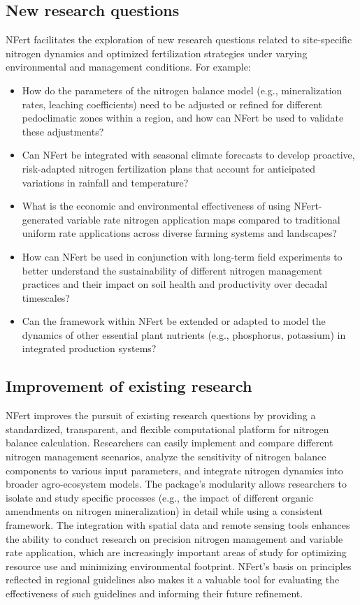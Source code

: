 \documentclass[
  11pt,
]{article}
\begin{document}
\subsection{New research questions}\label{new-research-questions}

NFert facilitates the exploration of new research questions related to
site-specific nitrogen dynamics and optimized fertilization strategies
under varying environmental and management conditions. For example:

\begin{itemize}
\item
  How do the parameters of the nitrogen balance model (e.g.,
  mineralization rates, leaching coefficients) need to be adjusted or
  refined for different pedoclimatic zones within a region, and how can
  NFert be used to validate these adjustments?
\item
  Can NFert be integrated with seasonal climate forecasts to develop
  proactive, risk-adapted nitrogen fertilization plans that account for
  anticipated variations in rainfall and temperature?
\item
  What is the economic and environmental effectiveness of using
  NFert-generated variable rate nitrogen application maps compared to
  traditional uniform rate applications across diverse farming systems
  and landscapes?
\item
  How can NFert be used in conjunction with long-term field experiments
  to better understand the sustainability of different nitrogen
  management practices and their impact on soil health and productivity
  over decadal timescales?
\item
  Can the framework within NFert be extended or adapted to model the
  dynamics of other essential plant nutrients (e.g., phosphorus,
  potassium) in integrated production systems?
\end{itemize}

\subsection{Improvement of existing
research}\label{improvement-of-existing-research}

NFert improves the pursuit of existing research questions by providing a
standardized, transparent, and flexible computational platform for
nitrogen balance calculation. Researchers can easily implement and
compare different nitrogen management scenarios, analyze the sensitivity
of nitrogen balance components to various input parameters, and
integrate nitrogen dynamics into broader agro-ecosystem models. The
package's modularity allows researchers to isolate and study specific
processes (e.g., the impact of different organic amendments on nitrogen
mineralization) in detail while using a consistent framework. The
integration with spatial data and remote sensing tools enhances the
ability to conduct research on precision nitrogen management and
variable rate application, which are increasingly important areas of
study for optimizing resource use and minimizing environmental
footprint. NFert's basis on principles reflected in regional guidelines
also makes it a valuable tool for evaluating the effectiveness of such
guidelines and informing their future refinement.
\end{document}
